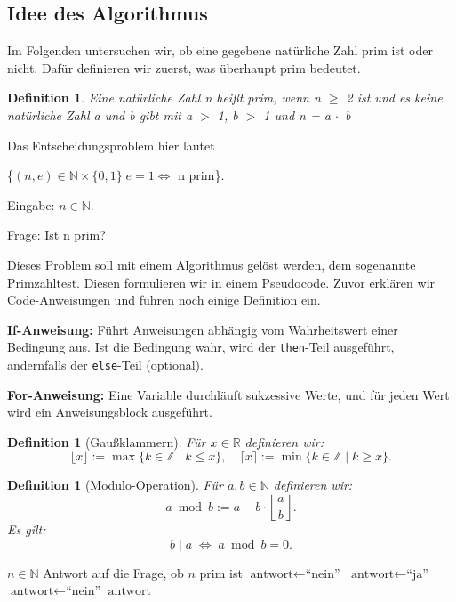 \documentclass{article}
\newcommand{\R}{\mathbb{R}}%
\newcommand{\N}{\mathbb{N}}%
\newtheorem{definition}[thm]{Definition} %
\begin{document}
\subsection{Idee des Algorithmus}

Im Folgenden untersuchen wir, ob eine gegebene natürliche Zahl prim ist oder nicht. Dafür definieren wir zuerst, was überhaupt prim bedeutet.

\begin{definition}
    Eine natürliche Zahl n heißt prim, wenn n $\ge$ 2 ist und es keine natürliche Zahl a und b gibt mit a $>$ 1, b $>$ 1 und n = a $\cdot\,$ b
\end{definition}

Das Entscheidungsproblem hier lautet 

\{$ (n,e) \in \N \times \{0,1\} | e = 1 \iff$ n prim\}.
\medskip

Eingabe: $n \in \N$.

Frage: Ist n prim?

\medskip

Dieses Problem soll mit einem Algorithmus gelöst werden, dem sogenannte Primzahltest. Diesen formulieren wir in einem Pseudocode. Zuvor erklären wir Code-Anweisungen und führen noch einige Definition ein.

\medskip

\textbf{If-Anweisung:}  
Führt Anweisungen abhängig vom Wahrheitswert einer Bedingung aus. Ist die Bedingung wahr, wird der \texttt{then}-Teil ausgeführt, andernfalls der \texttt{else}-Teil (optional).

\medskip

\textbf{For-Anweisung:}  
Eine Variable durchläuft sukzessive Werte, und für jeden Wert wird ein Anweisungsblock ausgeführt.


\begin{definition}[Gaußklammern]
Für $x \in \R$ definieren wir:
\[
\lfloor x \rfloor := \max \{ k \in \mathbb{Z} \mid k \le x \}, \quad
\lceil x \rceil := \min \{ k \in \mathbb{Z} \mid k \ge x \}.
\]
\end{definition}

\begin{definition}[Modulo-Operation]
Für $a,b \in \mathbb{N}$ definieren wir:
\[
a \bmod b := a - b \cdot \left\lfloor \frac{a}{b} \right\rfloor.
\]
Es gilt:
\[
b \mid a \;\Longleftrightarrow\; a \bmod b = 0.
\]
\end{definition}


\begin{algorithm}
\caption{Einfacher Primzahltest}
\begin{algorithmic}[1]
\Require $n \in \mathbb{N}$
\Ensure Antwort auf die Frage, ob $n$ prim ist
    \State $\text{antwort} \gets \text{``nein''}$
\Else
    \State $\text{antwort} \gets \text{``ja''}$
            \State $\text{antwort} \gets \text{``nein''}$
        \EndIf
    \EndFor
\EndIf
\State \Return $\text{antwort}$
\end{algorithmic}
\end{algorithm}
\end{document}
